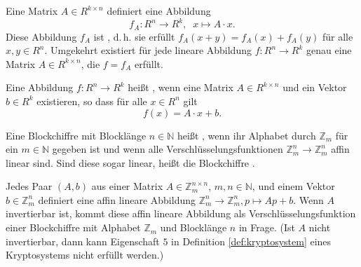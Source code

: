 Eine Matrix $A \in R^{k \times n}$ definiert eine Abbildung
\[f_{A}: R^n → R^k, \; \; x ↦ A \cdot x.\]
Diese Abbildung $f_A$ ist , d.\,h. sie erfüllt $f_A(x + y) = f_A(x) + f_A(y)$ für alle $x, y \in R^n$. Umgekehrt existiert für jede lineare Abbildung $f: R^n → R^k$ genau eine Matrix $A \in R^{k \times n}$, die $f = f_A$ erfüllt. 

Eine Abbildung $f: R^n → R^k$ heißt , wenn eine Matrix $A \in R^{k \times n}$ und ein Vektor $b \in R^k$ existieren, so dass für alle $x \in R^n$ gilt
\[f(x) = A \cdot x + b.\]


\begin{definition}
 Eine Blockchiffre mit Blocklänge $n \in ℕ$ heißt , wenn ihr Alphabet durch $ℤ_m$ für ein $m \in ℕ$ gegeben ist und wenn alle Verschlüsselungsfunktionen $ℤ_m^n → ℤ_m^n$ affin linear sind. Sind diese sogar linear, heißt die Blockchiffre .
\end{definition}

 Jedes Paar $(A, b)$ aus einer Matrix $A \in ℤ_m^{n \times n}$, $m, n \in ℕ$, und einem Vektor $b \in ℤ_m^n$ definiert eine affin lineare Abbildung $ℤ_m^n → ℤ_m^n, p ↦ Ap + b$. Wenn $A$ invertierbar ist, kommt diese affin lineare Abbildung als Verschlüsselungsfunktion einer Blockchiffre mit Alphabet $ℤ_m$ und Blocklänge $n$ in Frage. (Ist $A$ nicht invertierbar, dann kann Eigenschaft $5$ in Definition \ref{def:kryptosystem} eines Kryptosystems nicht erfüllt werden.)
  
